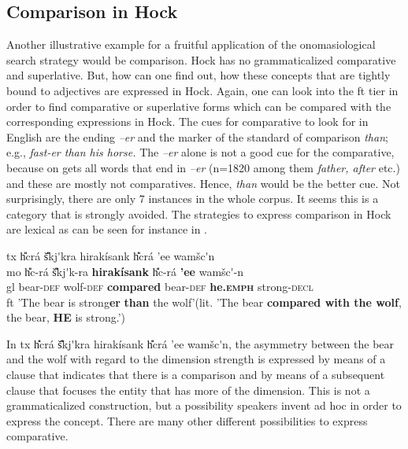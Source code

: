 \subsection{Comparison in Hoc{\A}k}\label{bouda:sec:comparison}

Another illustrative example for a fruitful application of the onomasiological search strategy would be comparison. Hoc{\A}k has no grammaticalized comparative and superlative. But, how can one find out, how these concepts that are tightly bound to adjectives are expressed in Hoc{\A}k. Again, one can look into the ft tier in order to find comparative or superlative forms which can be compared with the corresponding expressions in Hoc{\A}k. The cues for comparative to look for in English are the ending \textit{--er} and the marker of the standard of comparison \textit{than}; e.g., \textit{fast-er than his horse. }The \textit{--er} alone is not a good cue for the comparative, because on gets all words that end in \textit{--er} (n=1820 among them \textit{father, after} etc.) and these are mostly not comparatives. Hence, \textit{than} would be the better cue. Not surprisingly, there are only 7 instances in the whole corpus. It seems this is a category that is strongly avoided. The strategies to express comparison in Hoc{\A}k are lexical as can be seen for instance in  .

 

\ea\label{bouda:ex:bear}
\glll 
tx h{\U}{\U}cr\'a \v{s}{\U}{\U}kj\'{\A}kra hirak\'isan{\II}k h{\U}{\U}cr\'a 'ee wam{\A}\v{s}c\'{\A}{\A}n{\A} \\
mo h{\U}{\U}c-r\'a \v{s}{\U}{\U}kj\'{\A}k-ra \textbf{hirak\'isan{\II}k} h{\U}{\U}c-r\'a \textbf{'ee} wam{\A}\v{s}c\'{\A}-n{\A}\\
gl bear-\textsc{def} wolf-\textsc{def} \textbf{compared} bear-\textsc{def} \textbf{he.\textsc{\textbf{emph}}} strong-\textsc{decl}\\
ft 'The bear is strong\textbf{er} \textbf{than} the wolf'(lit. 'The bear \textbf{compared with the wolf}, the bear, \textbf{HE} is strong.') \\
\z


In tx h{\U}{\U}cr\'a \v{s}{\U}{\U}kj\'{\A}kra hirak\'isan{\II}k h{\U}{\U}cr\'a 'ee wam{\A}\v{s}c\'{\A}{\A}n{\A}, the asymmetry between the bear and the wolf with regard to the dimension strength is expressed by means of a clause that indicates that there is a comparison and by means of a subsequent clause that focuses the entity that has more of the dimension. This is not a grammaticalized construction, but a possibility speakers invent ad hoc in order to express the concept. There are many other different possibilities to express comparative.

